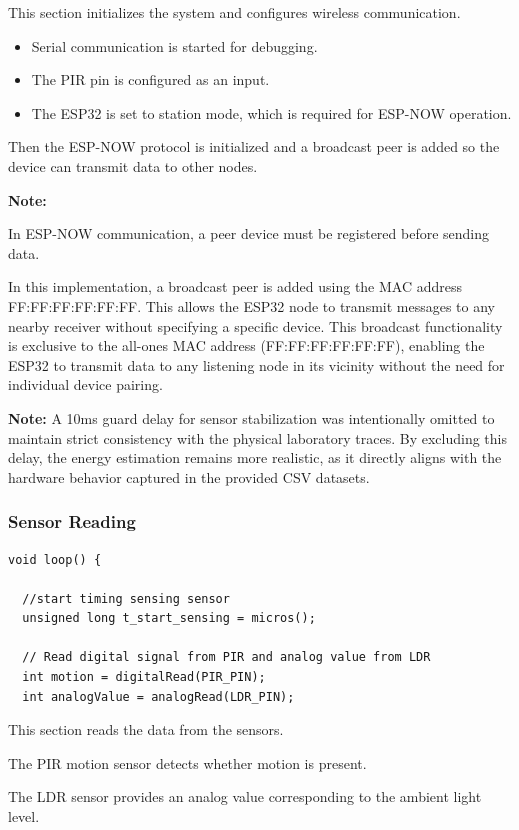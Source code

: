 \documentclass[11pt,a4paper]{article}
\begin{document}
This section initializes the system and configures wireless communication.

\begin{itemize}
\item Serial communication is started for debugging.
\item The PIR pin is configured as an input.
\item The ESP32 is set to station mode, which is required for ESP-NOW operation.
\end{itemize}

Then the ESP-NOW protocol is initialized and a broadcast peer is added so the device can transmit data to other nodes.

\textbf{Note:}

In ESP-NOW communication, a peer device must be registered before sending data.

In this implementation, a broadcast peer is added using the MAC address FF:FF:FF:FF:FF:FF. This allows the ESP32 node to transmit messages to any nearby receiver without specifying a specific device. This broadcast functionality is exclusive to the all-ones MAC address (FF:FF:FF:FF:FF:FF), enabling the ESP32 to transmit data to any listening node in its vicinity without the need for individual device pairing.

\textbf{Note:}
A 10ms guard delay for sensor stabilization was intentionally omitted to maintain strict consistency with the physical laboratory traces. By excluding this delay, the energy estimation remains more realistic, as it directly aligns with the hardware behavior captured in the provided CSV datasets.
\subsubsection*{Sensor Reading}

\begin{lstlisting}
void loop() {

  //start timing sensing sensor
  unsigned long t_start_sensing = micros();

  // Read digital signal from PIR and analog value from LDR
  int motion = digitalRead(PIR_PIN);
  int analogValue = analogRead(LDR_PIN);
\end{lstlisting}

This section reads the data from the sensors.

The PIR motion sensor detects whether motion is present.

The LDR sensor provides an analog value corresponding to the ambient light level.
\end{document}
